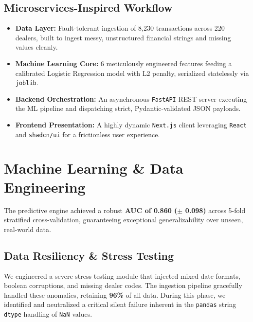 \documentclass[11pt, a4paper]{article}
\begin{document}
\subsection{Microservices-Inspired Workflow}
\begin{itemize}[leftmargin=*, label=\textcolor{accentcyan}{}]
    \item \textbf{Data Layer:} Fault-tolerant ingestion of 8,230 transactions across 220 dealers, built to ingest messy, unstructured financial strings and missing values cleanly.
    \item \textbf{Machine Learning Core:} 6 meticulously engineered features feeding a calibrated Logistic Regression model with L2 penalty, serialized statelessly via \texttt{joblib}.
    \item \textbf{Backend Orchestration:} An asynchronous \texttt{FastAPI} REST server executing the ML pipeline and dispatching strict, Pydantic-validated JSON payloads.
    \item \textbf{Frontend Presentation:} A highly dynamic \texttt{Next.js} client leveraging \texttt{React} and \texttt{shadcn/ui} for a frictionless user experience.
\end{itemize}

\section{Machine Learning \& Data Engineering}

\begin{premiumbox}
The predictive engine achieved a robust \textbf{AUC of 0.860 ($\pm$ 0.098)} across 5-fold stratified cross-validation, guaranteeing exceptional generalizability over unseen, real-world data.
\end{premiumbox}

\subsection{Data Resiliency \& Stress Testing}
We engineered a severe stress-testing module that injected mixed date formats, boolean corruptions, and missing dealer codes. The ingestion pipeline gracefully handled these anomalies, retaining \textbf{96\%} of all data. During this phase, we identified and neutralized a critical silent failure inherent in the \texttt{pandas} string \texttt{dtype} handling of \texttt{NaN} values.
\end{document}
